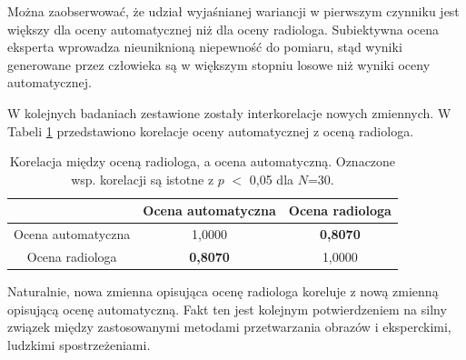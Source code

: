 Można zaobserwować, że udział wyjaśnianej wariancji w pierwszym czynniku jest większy dla oceny automatycznej niż dla oceny radiologa. Subiektywna ocena eksperta wprowadza nieuniknioną niepewność do pomiaru, stąd wyniki generowane przez człowieka są w większym stopniu losowe niż wyniki oceny automatycznej. 

W kolejnych badaniach zestawione zostały interkorelacje nowych zmiennych. \linebreak W Tabeli \ref{tab:gtVSpred} przedstawiono korelacje oceny automatycznej z oceną radiologa.

\vspace{10px}
\begin{table}[h]
	\centering
	\setlength{\tabcolsep}{3pt}
	\setlength\extrarowheight{2pt}
	\caption{Korelacja między oceną radiologa, a ocena automatyczną. Oznaczone wsp. korelacji są istotne z $p$ $<$ 0,05 dla $N$=30.}
	\label{tab:gtVSpred}
	\begin{tabular}{c|c|c}
		&Ocena automatyczna &Ocena radiologa \\
		\hline \hline
		Ocena automatyczna&1,0000&\textbf{0,8070}\\
		\hline
		Ocena radiologa&\textbf{0,8070}&1,0000\\
		
	\end{tabular}
\end{table}

Naturalnie, nowa zmienna opisująca ocenę radiologa koreluje z nową zmienną opisującą ocenę automatyczną. Fakt ten jest kolejnym potwierdzeniem na silny związek między zastosowanymi metodami przetwarzania obrazów i eksperckimi, ludzkimi spostrzeżeniami.
